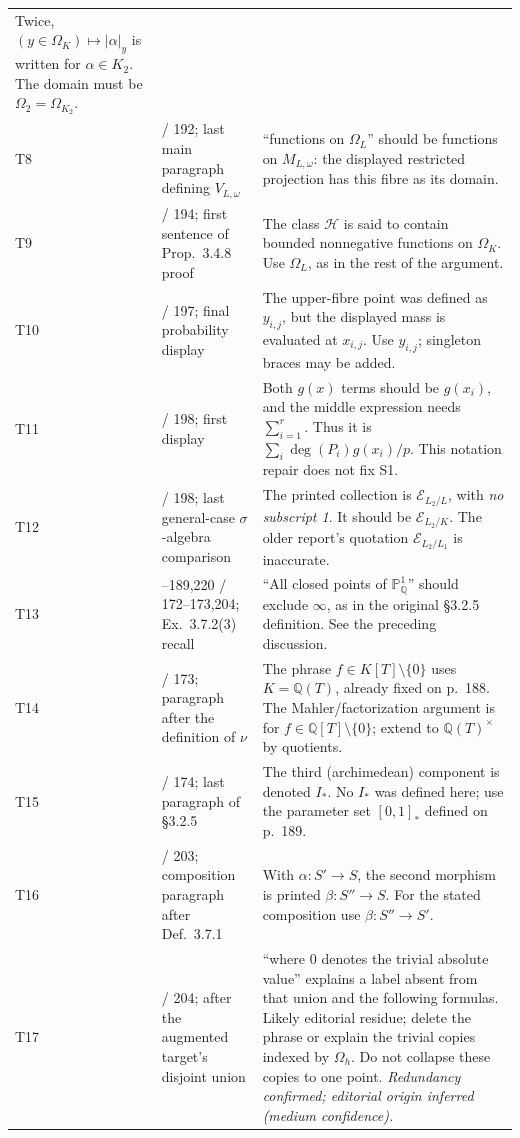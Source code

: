 \documentclass[11pt,a4paper]{article}
\newcommand{\Q}{\mathbb Q}
\newcommand{\E}{\mathcal E}
\newcommand{\PP}{\mathbb P}
\begin{document}
\begin{longtable}{@{}p{9mm}>{\raggedright\arraybackslash}p{29mm}>{\raggedright\arraybackslash}p{\dimexpr\linewidth-38mm-4\tabcolsep\relax}@{}}
Twice, $(y\in\Omega_K)\mapsto|\alpha|_y$ is written for $\alpha\in K_2$. The domain must be $\Omega_2=\Omega_{K_2}$.\\[4pt]
T8 & 208 / 192; last main paragraph defining $V_{L,\omega}$ &
“functions on $\Omega_L$” should be functions on $M_{L,\omega}$: the displayed restricted projection has this fibre as its domain.\\[4pt]
T9 & 210 / 194; first sentence of Prop.~3.4.8 proof &
The class $\mathcal H$ is said to contain bounded nonnegative functions on $\Omega_K$. Use $\Omega_L$, as in the rest of the argument.\\[4pt]
T10 & 213 / 197; final probability display &
The upper-fibre point was defined as $y_{i,j}$, but the displayed mass is evaluated at $x_{i,j}$. Use $y_{i,j}$; singleton braces may be added.\\[4pt]
T11 & 214 / 198; first display &
Both $g(x)$ terms should be $g(x_i)$, and the middle expression needs $\sum_{i=1}^r$. Thus it is $\sum_i\deg(P_i)g(x_i)/p$. This notation repair does not fix S1.\\[4pt]
T12 & 214 / 198; last general-case $\sigma$-algebra comparison &
The printed collection is $\E_{L_2/L}$, with \emph{no subscript 1}. It should be $\E_{L_2/K}$. The older report's quotation $\E_{L_2/L_1}$ is inaccurate.\\[4pt]
T13 & 188--189,220 / 172--173,204; Ex.~3.7.2(3) recall &
“All closed points of $\PP^1_\Q$” should exclude $\infty$, as in the original \S3.2.5 definition. See the preceding discussion.\\[4pt]
T14 & 189 / 173; paragraph after the definition of $\nu$ &
The phrase $f\in K[T]\setminus\{0\}$ uses $K=\Q(T)$, already fixed on p.~188. The Mahler/factorization argument is for $f\in\Q[T]\setminus\{0\}$; extend to $\Q(T)^\times$ by quotients.\\[4pt]
T15 & 190 / 174; last paragraph of \S3.2.5 &
The third (archimedean) component is denoted $I_*$. No $I_*$ was defined here; use the parameter set $[0,1]_*$ defined on p.~189.\\[4pt]
T16 & 219 / 203; composition paragraph after Def.~3.7.1 &
With $\alpha:S'\to S$, the second morphism is printed $\beta:S''\to S$. For the stated composition use $\beta:S''\to S'$.\\[4pt]
T17 & 220 / 204; after the augmented target's disjoint union &
“where $0$ denotes the trivial absolute value” explains a label absent from that union and the following formulas. Likely editorial residue; delete the phrase or explain the trivial copies indexed by $\Omega_h$. Do not collapse these copies to one point. \emph{Redundancy confirmed; editorial origin inferred (medium confidence).}\\[4pt]

\end{longtable}
\end{document}

